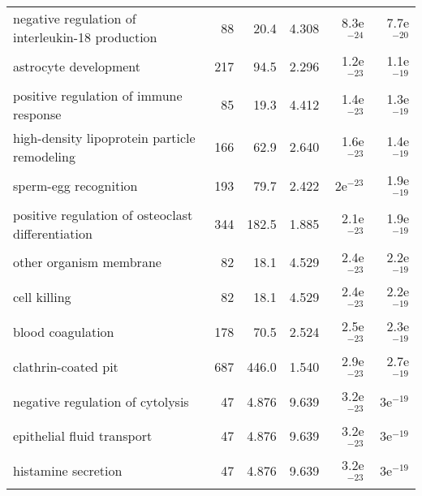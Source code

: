 \begin{longtable}{lrrrrr}
  negative regulation of interleukin-18 production &                      88 &                    20.4 &      4.308 &         8.3e$^{-24}$ &         7.7e$^{-20}$ \\
                             astrocyte development &                     217 &                    94.5 &      2.296 &         1.2e$^{-23}$ &         1.1e$^{-19}$ \\
            positive regulation of immune response &                      85 &                    19.3 &      4.412 &         1.4e$^{-23}$ &         1.3e$^{-19}$ \\
      high-density lipoprotein particle remodeling &                     166 &                    62.9 &      2.640 &         1.6e$^{-23}$ &         1.4e$^{-19}$ \\
                             sperm-egg recognition &                     193 &                    79.7 &      2.422 &           2e$^{-23}$ &         1.9e$^{-19}$ \\
 positive regulation of osteoclast differentiation &                     344 &                   182.5 &      1.885 &         2.1e$^{-23}$ &         1.9e$^{-19}$ \\
                           other organism membrane &                      82 &                    18.1 &      4.529 &         2.4e$^{-23}$ &         2.2e$^{-19}$ \\
                                      cell killing &                      82 &                    18.1 &      4.529 &         2.4e$^{-23}$ &         2.2e$^{-19}$ \\
                                 blood coagulation &                     178 &                    70.5 &      2.524 &         2.5e$^{-23}$ &         2.3e$^{-19}$ \\
                               clathrin-coated pit &                     687 &                   446.0 &      1.540 &         2.9e$^{-23}$ &         2.7e$^{-19}$ \\
                  negative regulation of cytolysis &                      47 &                   4.876 &      9.639 &         3.2e$^{-23}$ &           3e$^{-19}$ \\
                        epithelial fluid transport &                      47 &                   4.876 &      9.639 &         3.2e$^{-23}$ &           3e$^{-19}$ \\
                               histamine secretion &                      47 &                   4.876 &      9.639 &         3.2e$^{-23}$ &           3e$^{-19}$ \\

\end{longtable}
